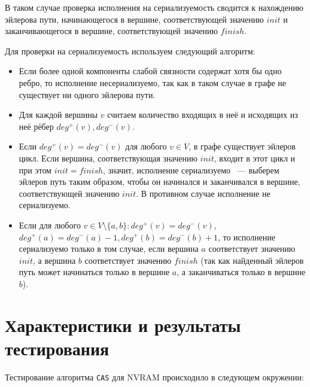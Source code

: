 \documentclass[times,specification,annotation]{itmo-student-thesis}
\begin{document}
В таком случае проверка исполнения на сериализуемость сводится к нахождению эйлерова пути, начинающегося в вершине, соответствующей значению $init$ и заканчивающегося в вершине, соответствующей значению $finish$.

Для проверки на сериализуемость используем следующий алгоритм:

\begin{itemize}
    \item Если более одной компоненты слабой связности содержат хотя бы одно ребро, то исполнение несериализуемо, так как в таком случае в графе не существует ни одного эйлерова пути.

    \item Для каждой вершины $v$ считаем количество входящих в неё и исходящих из неё рёбер $deg^+(v), deg^-(v)$.
    
    \item Если $deg^+(v) = deg^-(v)$ для любого $v \in V$, в графе существует эйлеров цикл. Если вершина, соответствующая значению $init$, входит в этот цикл и при этом $init = finish$, значит, исполнение сериализуемо ~--- выберем эйлеров путь таким образом, чтобы он начинался и заканчивался в вершине, соответствующей значению $init$. В противном случае исполнение не сериализуемо. 
    
    \item Если  для любого $v \in V \setminus \{a, b\}: deg^+(v) = deg^-(v),$
    $deg^+(a) = deg^-(a) - 1,  deg^+(b) = deg^-(b) + 1$, то исполнение сериализуемо только в том случае, если вершина $a$ соответствует значению $init$, а вершина $b$ соответствует значению $finish$ (так как найденный эйлеров путь может начинаться только в вершине $a$, а заканчиваться только в вершине $b$).
\end{itemize}

\section{Характеристики и результаты тестирования}

Тестирование алгоритма \texttt{CAS} для NVRAM происходило в следующем окружении:
\end{document}
